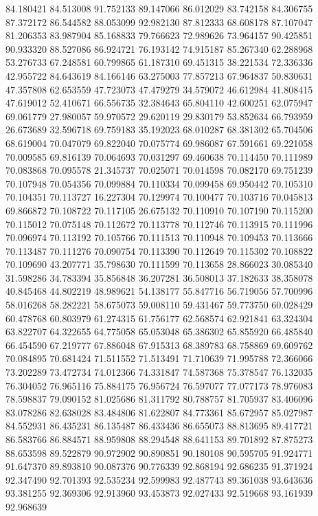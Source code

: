 84.180421
84.513008
91.752133
89.147066
86.012029
83.742158
84.306755
87.372172
86.544582
88.053099
92.982130
87.812333
68.608178
87.107047
81.206353
83.987904
85.168833
79.766623
72.989626
73.964157
90.425851
90.933320
88.527086
86.924721
76.193142
74.915187
85.267340
62.288968
53.276733
67.248581
60.799865
61.187310
69.451315
38.221534
72.336336
42.955722
84.643619
84.166146
63.275003
77.857213
67.964837
50.830631
47.357808
62.653559
47.723073
47.479279
34.579072
46.612984
41.808415
47.619012
52.410671
66.556735
32.384643
65.804110
42.600251
62.075947
69.061779
27.980057
59.970572
29.620119
29.830179
53.852634
66.793959
26.673689
32.596718
69.759183
35.192023
68.010287
68.381302
65.704506
68.619004
70.047079
69.822040
70.075774
69.986087
67.591661
69.221058
70.009585
69.816139
70.064693
70.031297
69.460638
70.114450
70.111989
70.083868
70.095578
21.345737
70.025071
70.014598
70.082170
69.751239
70.107948
70.054356
70.099884
70.110334
70.099458
69.950442
70.105310
70.104351
70.113727
16.227304
70.129974
70.100477
70.103716
70.045813
69.866872
70.108722
70.117105
26.675132
70.110910
70.107190
70.115200
70.115012
70.075148
70.112672
70.113778
70.112746
70.113915
70.111996
70.096974
70.113192
70.105766
70.111513
70.110948
70.109453
70.113666
70.113487
70.111276
70.090754
70.113390
70.112649
70.115302
70.108822
70.109690
43.207771
35.798630
70.111599
70.113658
28.866023
30.085340
31.598286
34.783394
35.856848
36.207281
36.508013
37.182633
38.358078
40.845468
44.802219
48.989621
54.138177
55.847716
56.719056
57.700996
58.016268
58.282221
58.675073
59.008110
59.431467
59.773750
60.028429
60.478768
60.803979
61.274315
61.756177
62.568574
62.921841
63.324304
63.822707
64.322655
64.775058
65.053048
65.386302
65.855920
66.485840
66.454590
67.219777
67.886048
67.915313
68.389783
68.758869
69.609762
70.084895
70.681424
71.511552
71.513491
71.710639
71.995788
72.366066
73.202289
73.472734
74.012366
74.331847
74.587368
75.378547
76.132035
76.304052
76.965116
75.884175
76.956724
76.597077
77.077173
78.976083
78.598837
79.090152
81.025686
81.311792
80.788757
81.705937
83.406096
83.078286
82.638028
83.484806
81.622807
84.773361
85.672957
85.027987
84.552931
86.435231
86.135487
86.433436
86.655073
88.813695
89.417721
86.583766
86.884571
88.959808
88.294548
88.641153
89.701892
87.875273
88.653598
89.522879
90.972902
90.890851
90.180108
90.595705
91.924771
91.647370
89.893810
90.087376
90.776339
92.868194
92.686235
91.371924
92.347490
92.701393
92.535234
92.599983
92.487743
89.361038
93.643636
93.381255
92.369306
92.913960
93.453873
92.027433
92.519668
93.161939
92.968639
